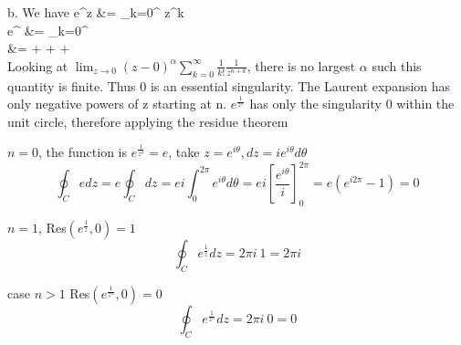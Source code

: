 \documentclass[12pt,twoside]{article}
\begin{document}
\item [b.]
We have
\ba
	e^z				&=	\sum_{k=0}^\infty {} z^k \\
	e^{}	&=	\sum_{k=0}^\infty {}  \\
					&= 	 +  +  + \cdots \\
\ea
Looking at $\lim_{z\rightarrow 0} (z-0)^\alpha \sum_{k=0}^\infty \frac{1}{k!} \frac{1}{z^{n+k}}$, there is no largest $\alpha$ such this quantity is finite.
Thus $0$ is an essential singularity. The Laurent expansion has only negative powers of z starting at n. 
$e^{\frac{1}{z^n}}$ has only the singularity $0$ within the unit circle, therefore applying the residue theorem
\bi
\item $n = 0$, the function is $e^{\frac{1}{z^0}} = e$, take $z=e^{i \theta}, dz = i e^{i \theta} d\theta$
\[
	 \oint_C edz = e \oint_C dz = e i \int_0^{2\pi} e^{i \theta} d\theta = e i [\frac{e^{i \theta}}{i}]_0^{2\pi} = e (e^{i 2 \pi} - 1) = 0
\]
\item $n = 1$, Res$(e^{\frac{1}{z}}, 0) = 1$
\[
	 \oint_C e^{\frac{1}{z}} dz = 2 \pi i ~ 1 = 2 \pi i
\]
\item case $n > 1$ Res$(e^{\frac{1}{z^n}}, 0) = 0$
\[
	 \oint_C e^{\frac{1}{z^n}} dz = 2 \pi i ~ 0 = 0
\]
\ei

\ee

\ee
\end{document}
